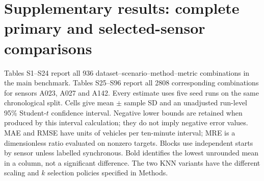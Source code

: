 

\clearpage

\begingroup

\hypersetup{linkcolor=black}

\renewcommand{\thetable}{S\arabic{table}}

\setcounter{table}{0}

\section*{{Supplementary results: complete primary and selected-sensor comparisons}}

{Tables S1--S24 report all 936 dataset--scenario--method--metric combinations in the main benchmark. Tables S25--S96 report all 2808 corresponding combinations for sensors A023, A027 and A142. Every estimate uses five seed runs on the same chronological split. Cells give mean $\pm$ sample SD and an unadjusted run-level 95\% Student-$t$ confidence interval. Negative lower bounds are retained when produced by this interval calculation; they do not imply negative error values. MAE and RMSE have units of vehicles per ten-minute interval; MRE is a dimensionless ratio evaluated on nonzero targets. Blocks use independent starts by sensor unless labelled synchronous. Bold identifies the lowest unrounded mean in a column, not a significant difference. The two KNN variants have the different scaling and $k$ selection policies specified in Methods.}


